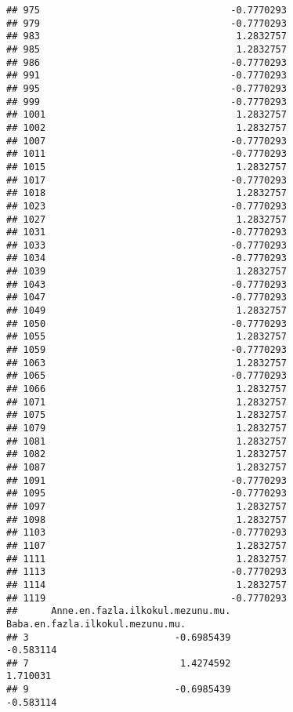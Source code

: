 \documentclass[
]{article}
\begin{document}
\begin{verbatim}
## 975                                  -0.7770293
## 979                                  -0.7770293
## 983                                   1.2832757
## 985                                   1.2832757
## 986                                  -0.7770293
## 991                                  -0.7770293
## 995                                  -0.7770293
## 999                                  -0.7770293
## 1001                                  1.2832757
## 1002                                  1.2832757
## 1007                                 -0.7770293
## 1011                                 -0.7770293
## 1015                                  1.2832757
## 1017                                 -0.7770293
## 1018                                  1.2832757
## 1023                                 -0.7770293
## 1027                                  1.2832757
## 1031                                 -0.7770293
## 1033                                 -0.7770293
## 1034                                 -0.7770293
## 1039                                  1.2832757
## 1043                                 -0.7770293
## 1047                                 -0.7770293
## 1049                                  1.2832757
## 1050                                 -0.7770293
## 1055                                  1.2832757
## 1059                                 -0.7770293
## 1063                                  1.2832757
## 1065                                 -0.7770293
## 1066                                  1.2832757
## 1071                                  1.2832757
## 1075                                  1.2832757
## 1079                                  1.2832757
## 1081                                  1.2832757
## 1082                                  1.2832757
## 1087                                  1.2832757
## 1091                                 -0.7770293
## 1095                                 -0.7770293
## 1097                                  1.2832757
## 1098                                  1.2832757
## 1103                                 -0.7770293
## 1107                                  1.2832757
## 1111                                  1.2832757
## 1113                                 -0.7770293
## 1114                                  1.2832757
## 1119                                 -0.7770293
##      Anne.en.fazla.ilkokul.mezunu.mu. Baba.en.fazla.ilkokul.mezunu.mu.
## 3                          -0.6985439                        -0.583114
## 7                           1.4274592                         1.710031
## 9                          -0.6985439                        -0.583114

\end{verbatim}
\end{document}
